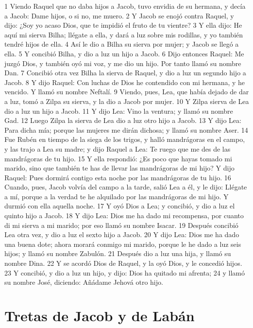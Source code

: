 1 Viendo Raquel que no daba hijos a Jacob, tuvo envidia de su hermana, y decía a Jacob: Dame hijos, o si no, me muero.
2 Y Jacob se enojó contra Raquel, y dijo: ¿Soy yo acaso Dios, que te impidió el fruto de tu vientre?
3 Y ella dijo: He aquí mi sierva Bilha; llégate a ella, y dará a luz sobre mis rodillas, y yo también tendré hijos de ella.
4 Así le dio a Bilha su sierva por mujer; y Jacob se llegó a ella.
5 Y concibió Bilha, y dio a luz un hijo a Jacob.
6 Dijo entonces Raquel: Me juzgó Dios, y también oyó mi voz, y me dio un hijo. Por tanto llamó su nombre Dan.
7 Concibió otra vez Bilha la sierva de Raquel, y dio a luz un segundo hijo a Jacob.
8 Y dijo Raquel: Con luchas de Dios he contendido con mi hermana, y he vencido. Y llamó su nombre Neftalí.
9 Viendo, pues, Lea, que había dejado de dar a luz, tomó a Zilpa su sierva, y la dio a Jacob por mujer.
10 Y Zilpa sierva de Lea dio a luz un hijo a Jacob.
11 Y dijo Lea: Vino la ventura; y llamó su nombre Gad.
12 Luego Zilpa la sierva de Lea dio a luz otro hijo a Jacob.
13 Y dijo Lea: Para dicha mía; porque las mujeres me dirán dichosa; y llamó su nombre Aser.
14 Fue Rubén en tiempo de la siega de los trigos, y halló mandrágoras en el campo, y las trajo a Lea su madre; y dijo Raquel a Lea: Te ruego que me des de las mandrágoras de tu hijo.
15 Y ella respondió: ¿Es poco que hayas tomado mi marido, sino que también te has de llevar las mandrágoras de mi hijo? Y dijo Raquel: Pues dormirá contigo esta noche por las mandrágoras de tu hijo.
16 Cuando, pues, Jacob volvía del campo a la tarde, salió Lea a él, y le dijo: Llégate a mí, porque a la verdad te he alquilado por las mandrágoras de mi hijo. Y durmió con ella aquella noche.
17 Y oyó Dios a Lea; y concibió, y dio a luz el quinto hijo a Jacob.
18 Y dijo Lea: Dios me ha dado mi recompensa, por cuanto di mi sierva a mi marido; por eso llamó su nombre Isacar.
19 Después concibió Lea otra vez, y dio a luz el sexto hijo a Jacob.
20 Y dijo Lea: Dios me ha dado una buena dote; ahora morará conmigo mi marido, porque le he dado a luz seis hijos; y llamó su nombre Zabulón.
21 Después dio a luz una hija, y llamó su nombre Dina.
22 Y se acordó Dios de Raquel, y la oyó Dios, y le concedió hijos.
23 Y concibió, y dio a luz un hijo, y dijo: Dios ha quitado mi afrenta;
24 y llamó su nombre José, diciendo: Añádame Jehová otro hijo.

\section{Tretas de Jacob y de Labán}

